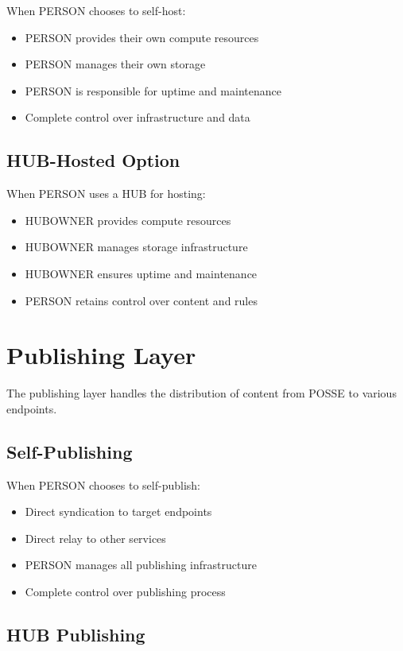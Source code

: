 \documentclass[11pt]{article}
\begin{document}
When PERSON chooses to self-host:
\begin{itemize}
    \item PERSON provides their own compute resources
    \item PERSON manages their own storage
    \item PERSON is responsible for uptime and maintenance
    \item Complete control over infrastructure and data
\end{itemize}

\subsection{HUB-Hosted Option}

When PERSON uses a HUB for hosting:
\begin{itemize}
    \item HUBOWNER provides compute resources
    \item HUBOWNER manages storage infrastructure
    \item HUBOWNER ensures uptime and maintenance
    \item PERSON retains control over content and rules
\end{itemize}

\section{Publishing Layer}

The publishing layer handles the distribution of content from POSSE to various endpoints.

\subsection{Self-Publishing}

When PERSON chooses to self-publish:
\begin{itemize}
    \item Direct syndication to target endpoints
    \item Direct relay to other services
    \item PERSON manages all publishing infrastructure
    \item Complete control over publishing process
\end{itemize}

\subsection{HUB Publishing}
\end{document}
